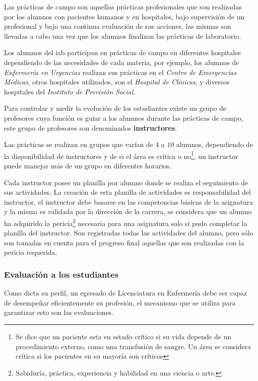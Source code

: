 Las prácticas de campo son aquellas prácticas profesionales que son
realizadas por los alumnos con pacientes humanos y en hospitales, bajo
supervisión de un profesional y bajo una continua evaluación de sus
acciones, las mismas son llevadas a cabo una vez que los alumnos finalizan
las prácticas de laboratorio.


Los alumnos del \Gls{iab} participan en prácticas de campo 
en diferentes hospitales dependiendo de las necesidades de cada
materia, por ejemplo, los alumnos de \textit{Enfermería en Urgencias} realizan
sus prácticas en el \textit{Centro de Emergencias Médicas}, otros hospitales
utilizados, son el \textit{Hospital de Clínicas}, y diversos hospitales del
\textit{Instituto de Previsión Social}.


Para controlar y medir la evolución de los estudiantes existe un grupo de
profesores cuya función es guiar a los alumnos durante las prácticas de campo,
este grupo de profesores son denominados \textbf{instructores}.

Las prácticas se realizan en grupos que varían de $4$ a $10$ alumnos, dependiendo de
la disponibilidad de instructores y de si el área es crítica o no\footnote{Se
dice que un paciente esta en estado crítico si su vida depende de un
procedimiento externo, como una transfusión de sangre. Un área se considera
crítica si los pacientes en su mayoría son críticos}, un instructor puede
manejar más de un grupo en diferentes horarios. 

Cada instructor posee un planilla por alumno donde se realiza el seguimiento de
sus actividades. La creación de esta planilla de actividades es responsabilidad
del instructor, el instructor debe basarse en las competencias básicas de la
asignatura y la misma es validada por la dirección de la carrera, se considera
que un alumno ha adquirido la pericia\footnote{Sabiduría, práctica, experiencia y 
habilidad en una ciencia o arte.} necesaria para una asignatura solo si pudo
completar la planilla del instructor. Son registradas todas
las actividades del alumno, pero sólo son tomadas en cuenta para el progreso final 
aquellas que son realizadas con la pericia requerida.

\subsubsection{Evaluación a los estudiantes}
\label{sec:problema_evaluacion}

Como dicta su perfil, un egresado de Licenciatura en Enfermería 
debe ser capaz de desempeñar eficientemente su
profesión, el mecanismo que se utiliza para garantizar esto son las
evaluaciones.

